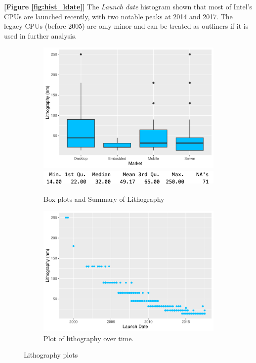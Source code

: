 
\textbf{[Figure \ref{fig:hist_ldate}]} The \textit{Launch date} histogram shown that most of Intel's CPUs are launched recently, with two notable peaks at 2014 and 2017. The legacy
CPUs (before 2005) are only minor and can be treated as outliners if it is used in further analysis.






\begin{figure}[H]
    \centering
    \begin{subfigure}[b]{0.49\textwidth}
        \includegraphics[width=\textwidth]{./graphics/box_litho.pdf}
        \includegraphics[width=\textwidth]{./graphics/sum_litho.png}
        \caption{Box plots and Summary of Lithography}
        \label{fig:box_litho}
    \end{subfigure}
    \hfill
    \begin{subfigure}[b]{0.49\textwidth}
        \includegraphics[width=\textwidth]{./graphics/scatter_litho.pdf}
        \caption{Plot of lithography over time.}
        \label{fig:scatter_litho}
    \end{subfigure}
    \caption{Lithography plots}
\end{figure}

